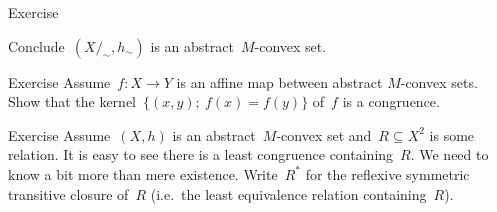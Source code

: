\documentclass[b]{subfiles}
\begin{document}
\begin{parsec}
\begin{point}{Exercise}
\begin{enumerate}
Conclude~$(X/_\sim,h_\sim)$ is an abstract~$M$-convex set.
\end{enumerate}
\end{point}
\begin{point}{Exercise}%
Assume~$f\colon X \to Y$ is an affine map between abstract
    $M$-convex sets.
Show that the kernel~$\{(x,y);\ f(x) = f(y)\}$ of~$f$
    is a congruence.
\end{point}
\begin{point}{Exercise}%
Assume~$(X,h)$ is an abstract~$M$-convex set and~$R \subseteq X^2$
    is some relation.
It is easy to see there is a least congruence containing~$R$.
We need to know a bit more than mere existence.
Write~$R^*$ for the reflexive symmetric transitive closure of~$R$
    (i.e.~the least equivalence relation containing~$R$).


\end{point}
\end{parsec}
\end{document}
